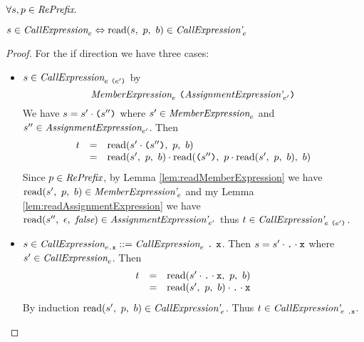 \documentclass[preprint,10pt]{sigplanconf}
\begin{document}
\begin{lemma}\mbox{}
  
  \( \forall s, p \in \textit{RePrefix}. \)
 
  \( s \in \textit{CallExpression}_{e} \Leftrightarrow 
  \textrm{read}(s,~p,~b) \in \textit{CallExpression'}_{e} \)
\end{lemma}
\begin{proof}
  For the if direction we have three cases:
  \begin{itemize}
  \item \( s \in \textit{CallExpression}_{e~\texttt{(}e'\texttt{)}} \) by
    \[
    \textit{MemberExpression}_{e}~\texttt{(}\textit{AssignmentExpression'}_{e'}\texttt{)}
    \]
    We have \( s = s' \cdot \texttt{(}s''\texttt{)} \) where \( s' \in
    \textit{MemberExpression}_{e} \) and \( s'' \in
    \textit{AssignmentExpression}_{e'} \). Then
    \[
    \begin{array}{rcl}
      t &=& \textrm{read}(s' \cdot \texttt{(}s''\texttt{)},~p,~b)
      \\
      &=& \textrm{read}(s',~p,~b) \cdot
      \textrm{read}(\texttt{(}s''\texttt{)},~
        p \cdot \textrm{read}(s',~p,~b)
      ,~b)
    \end{array}
    \]
    Since \( p \in \textit{RePrefix} \), by Lemma
    \ref{lem:readMemberExpression} we have \( \textrm{read}(s',~p,~b) \in
    \textit{MemberExpression'}_{e} \) and my Lemma
    \ref{lem:readAssignmentExpression} we have
    \(\textrm{read}(s'',~\epsilon,~\textit{false}) \in
    \textit{AssignmentExpression'}_{e'} \) thus \( t \in
    \textit{CallExpression'}_{e~\texttt{(}e'\texttt{)}} \).

  \item \( s \in \textit{CallExpression}_{e\texttt{.\texttt{x}}} ::=
    \textit{CallExpression}_{e} ~\texttt{.} ~\texttt{x} \). Then
    \( s = s' \cdot \texttt{.}\cdot \texttt{x} \) where \( s' \in
    \textit{CallExpression}_{e} \). Then
    \[
    \begin{array}{rcl}
      t &=& \textrm{read}(s' \cdot \texttt{.} \cdot \texttt{x},~p,~b)
      \\
      &=& \textrm{read}(s',~p,~b) \cdot \texttt{.}\cdot \texttt{x}
    \end{array}
    \]
    By induction \( \textrm{read}(s',~p,~b) \in \textit{CallExpression'}_{e}
    \). Thus \( t \in \textit{CallExpression'}_{e~\texttt{.\texttt{x}}} \).
  \end{itemize}
\end{proof}
\end{document}
